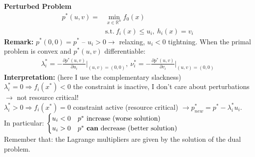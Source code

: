 \documentclass[a4paper]{article}
\begin{document}
\begin{multicols}{2}
    \noindent
    \textbf{\small Perturbed Problem}
    \vspace{-0.2cm}
    \begin{align*}
        p^*(u,v) =& \min_{x\in\mathbb{R}^n} f_0(x)\\
        &\text{s.t.} \ f_i(x)\le{u_i},\ h_i(x)=v_i
    \end{align*}
    \textbf{Remark:} $p^*(0,0)=p^*$ --
    $u_i>0\to$ relaxing, $u_i<0$ tightning. 
    When the primal problem is convex and $p^*(u,v)$ differentiable: 
    \begin{align*}
        \lambda_i^* = -\frac{\partial{p^*(u,v)}}{\partial{u_i}}\big|_{(u,v)=(0,0)}, \ 
        \nu_i^* = -\frac{\partial{p^*(u,v)}}{\partial{v_i}}\big|_{(u,v)=(0,0)}
    \end{align*}
    \textbf{Interpretation:} {\tiny{(here I use the complementary slackness)}} \\
    $\lambda_i^*=0 \Rightarrow f_i(x^*)<0$ the constraint is inactive, I don't care about perturbations $\to$ not resource critical! \\$\lambda_i^*>0 \Rightarrow f_i(x^*)=0$ constraint active (resource critical) $\to {p^*_{new}=p^*-\lambda_i^*{u_i}}$.\\
    In particular: $\begin{cases}
        u_i<0&p^* \ \text{increase (worse solution)}\\
        u_i>0&p^* \ \text{\textbf{can} decrease (better solution)}
    \end{cases}$\\

    \noindent
    Remember that: the Lagrange multipliers are given by the solution of the dual problem.
\end{multicols}
\newpage
\end{document}
